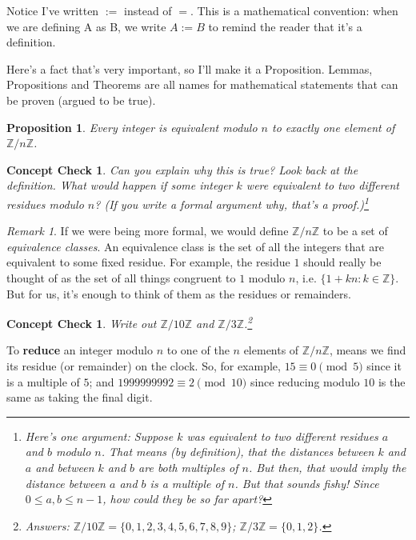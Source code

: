 \documentclass{article}
\theoremstyle{plain}
\newtheorem{proposition}[theorem]{Proposition}
\newtheorem{checkin}[theorem]{Concept Check}
\theoremstyle{definition}
\theoremstyle{remark}
\newtheorem{remark}[theorem]{Remark}
\numberwithin{theorem}{section}
\newcommand{\ZZ}{\mathbb{Z}}
\begin{document}
Notice I've written $:=$ instead of $=$.  This is a mathematical convention:  when we are defining A as B, we write $A := B$ to remind the reader that it's a definition.

Here's a fact that's very important, so I'll make it a Proposition.  Lemmas, Propositions and Theorems are all names for mathematical statements that can be proven (argued to be true).

\begin{proposition}
Every integer is equivalent modulo $n$ to exactly one element of $\ZZ/n\ZZ$.  
\end{proposition}

\begin{checkin}
  Can you explain why this is true?  Look back at the definition.  What would happen if some integer $k$ were equivalent to two different residues modulo $n$?  (If you write a formal argument why, that's a proof.)\footnote{Here's one argument:  Suppose $k$ was equivalent to two different residues $a$ and $b$ modulo $n$.  That means (by definition), that the distances between $k$ and $a$ and between $k$ and $b$ are both multiples of $n$.  But then, that would imply the distance between $a$ and $b$ is a multiple of $n$.  But that sounds fishy!  Since $0 \le a,b \le n-1$, how could they be so far apart?}
\end{checkin}

\begin{remark}
   If we were being more formal, we would define $\ZZ/n\ZZ$ to be a set of \emph{equivalence classes}.  An equivalence class is the set of all the integers that are equivalent to some fixed residue.  For example, the residue $1$ should really be thought of as the set of all things congruent to $1$ modulo $n$, i.e. $\{ 1 + kn: k \in \ZZ \}$.  But for us, it's enough to think of them as the residues or remainders.
\end{remark}

\begin{checkin}
    Write out $\ZZ/10\ZZ$ and $\ZZ/3\ZZ$.\footnote{Answers: $\ZZ/10\ZZ = \{0,1,2,3,4,5,6,7,8,9\}$; $\ZZ/3\ZZ = \{ 0,1,2\}$.}
\end{checkin}

To \textbf{reduce} an integer modulo $n$ to one of the $n$ elements of $\ZZ/n\ZZ$, means we find its residue (or remainder) on the clock.  So, for example, $15 \equiv 0 \pmod{5}$ since it is a multiple of $5$; and $1999999992 \equiv 2 \pmod{10}$ since reducing modulo $10$ is the same as taking the final digit.  
\end{document}
